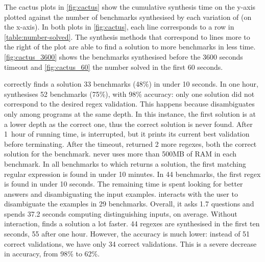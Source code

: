 

The cactus plots in \autoref{fig:cactus} show the cumulative synthesis time on the y-axis plotted against the number of benchmarks synthesised by each variation of \Forest{} (on the x-axis).
%
In both plots in \autoref{fig:cactus}, each line corresponds to a row in \autoref{table:number-solved}.
%
The synthesis methods that correspond to lines more to the right of the plot are able to find a solution to more benchmarks in less time. \autoref{fig:cactus_3600} shows the benchmarks synthesised before the 3600 seconds timeout and \autoref{fig:cactus_60} the number solved in the first 60 seconds.

\Forest correctly finds a solution 33 benchmarks (48\%) in under 10 seconds.
In one hour, \Forest{} synthesises 52 benchmarks (75\%), with 98\% accuracy: only one solution did not correspond to the desired regex validation. This happens because \Forest disambiguates only among programs at the same depth. In this instance, the first solution is at a lower depth as the correct one, thus the correct solution is never found. 
After 1~hour of running time, \Forest{} is interrupted, but it prints its current best validation before terminating.
After the timeout, \Forest{} returned 2 more regexes, both the correct solution for the benchmark. \Forest{} never uses more than 500MB of RAM in each benchmark.
%
In all benchmarks to which \Forest returns a solution, the first matching regular expression is found in under 10 minutes. In 44 benchmarks, the first regex is found in under 10 seconds.  The remaining time is spent looking for better answers and disambiguating the input examples. 
\Forest interacts with the user to disambiguate the examples in 29 benchmarks. Overall, it asks 1.7 questions and spends 37.2 seconds computing distinguishing inputs, on average. 
%
Without interaction, \Forest finds a solution a lot faster. 44 regexes are synthesised in the first ten seconds, 55 after one hour. However, the accuracy is much lower: instead of 51 correct validations, we have only 34 correct validations. This is a severe decrease in accuracy, from 98\% to 62\%.

